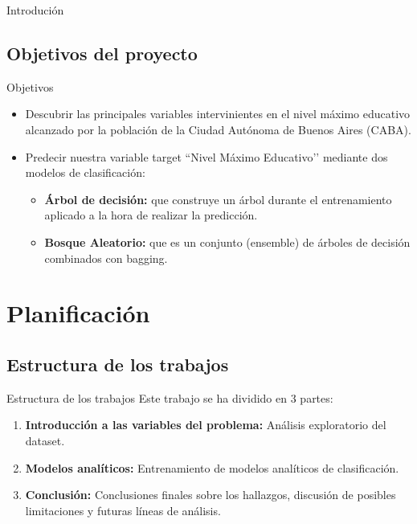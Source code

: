\documentclass[pdf]{beamer}
\begin{document}
{\begin{frame}{Introdución}
\end{frame}

    \subsection{Objetivos del proyecto}

\begin{frame}{Objetivos}

    \begin{itemize}
        \justifying%
        \item Descubrir las principales variables intervinientes en el nivel máximo educativo alcanzado por la población de la Ciudad Autónoma de Buenos Aires (CABA).
        
        \item Predecir nuestra variable target ``Nivel Máximo Educativo’’ mediante dos modelos de clasificación:
        \begin{itemize}
            \justifying%
            \item \textbf{Árbol de decisión:} que construye un árbol durante el entrenamiento aplicado a la hora de realizar la predicción.
            \item \textbf{Bosque Aleatorio:} que es un conjunto (ensemble) de árboles de decisión combinados con bagging.
        \end{itemize}
    \end{itemize}
\end{frame}
\section{Planificación}
    \subsection*{Estructura de los trabajos}
\begin{frame}{Estructura de los trabajos}
    Este trabajo se ha dividido en 3 partes:
    \begin{enumerate}
        \justifying%
        \item \textbf{Introducción a las variables del problema:} Análisis exploratorio del dataset. 
        \item \textbf{Modelos analíticos:} Entrenamiento de modelos analíticos de clasificación.
        \item \textbf{Conclusión:} Conclusiones finales sobre los hallazgos, discusión de posibles limitaciones y futuras líneas de análisis.
        

\end{enumerate}
\end{frame}}
\end{document}
